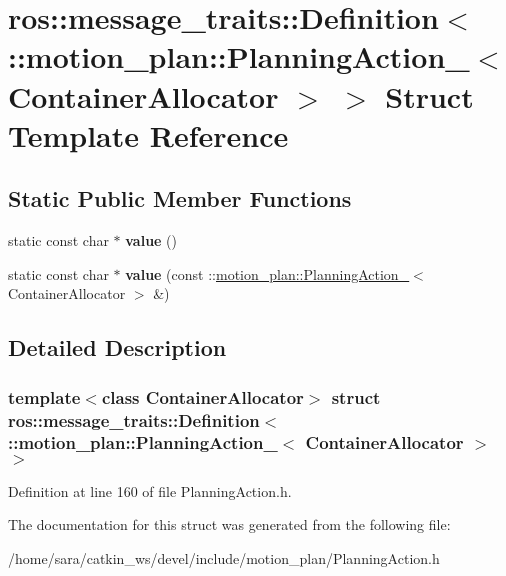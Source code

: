 \hypertarget{structros_1_1message__traits_1_1Definition_3_01_1_1motion__plan_1_1PlanningAction___3_01ContainerAllocator_01_4_01_4}{}\section{ros\+:\+:message\+\_\+traits\+:\+:Definition$<$ \+:\+:motion\+\_\+plan\+:\+:Planning\+Action\+\_\+$<$ Container\+Allocator $>$ $>$ Struct Template Reference}
\label{structros_1_1message__traits_1_1Definition_3_01_1_1motion__plan_1_1PlanningAction___3_01ContainerAllocator_01_4_01_4}
\subsection*{Static Public Member Functions}
\begin{DoxyCompactItemize}
\item 
\mbox{\label{structros_1_1message__traits_1_1Definition_3_01_1_1motion__plan_1_1PlanningAction___3_01ContainerAllocator_01_4_01_4_a28a08e79a5bbc96349e67244d0350e50}} 
static const char $\ast$ {\bfseries value} ()
\item 
\mbox{\label{structros_1_1message__traits_1_1Definition_3_01_1_1motion__plan_1_1PlanningAction___3_01ContainerAllocator_01_4_01_4_a1325953b86d9163b402ab478b4e6edcd}} 
static const char $\ast$ {\bfseries value} (const \+::\hyperlink{structmotion__plan_1_1PlanningAction__}{motion\+\_\+plan\+::\+Planning\+Action\+\_\+}$<$ Container\+Allocator $>$ \&)
\end{DoxyCompactItemize}


\subsection{Detailed Description}
\subsubsection*{template$<$class Container\+Allocator$>$\newline
struct ros\+::message\+\_\+traits\+::\+Definition$<$ \+::motion\+\_\+plan\+::\+Planning\+Action\+\_\+$<$ Container\+Allocator $>$ $>$}



Definition at line 160 of file Planning\+Action.\+h.



The documentation for this struct was generated from the following file\+:\begin{DoxyCompactItemize}
\item 
/home/sara/catkin\+\_\+ws/devel/include/motion\+\_\+plan/Planning\+Action.\+h\end{DoxyCompactItemize}
